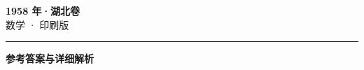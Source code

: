 \documentclass[zihao=5, a4paper]{ctexart}
\begin{document}
\begin{center}
  {\Large\bfseries 1958 年·湖北卷}\\[4pt]
  {\large 数学 · 印刷版}
\end{center}
\medskip
{}

\par\bigskip\hrule\bigskip
{}
\begin{center}{\large\bfseries 参考答案与详细解析}\end{center}
\smallskip

\end{document}
